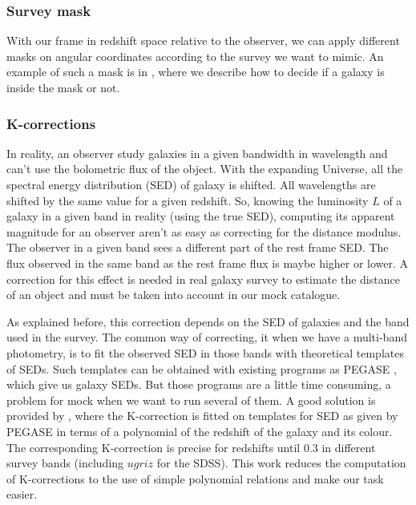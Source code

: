 \subsubsection{Survey mask}

With our frame in redshift space relative to the observer, we can apply
different masks on angular coordinates according to the survey we want to
mimic. An example of such a mask is in , where we
describe how to decide if a galaxy is inside the mask or not.

\subsubsection{K-corrections}

In reality, an observer study galaxies in a given bandwidth in wavelength and
can't use the bolometric flux of the object. With the expanding Universe, all
the spectral energy distribution (SED) of galaxy is shifted. All wavelengths
are shifted by the same value for a given redshift. So, knowing the luminosity
$L$ of a galaxy in a given band in reality (using the true SED), computing its
apparent magnitude for an observer aren't as easy as correcting for the
distance modulus. The observer in a given band sees a different part of the
rest frame SED\@. The flux observed in the same band as the rest frame flux is
maybe higher or lower. A correction for this effect is needed in real galaxy
survey to estimate the distance of an object and must be taken into account in
our mock catalogue.

As explained before, this correction depends on the SED of galaxies and the
band used in the survey. The common way of correcting, it when we have a
multi-band photometry, is to fit the observed SED in those bands with
theoretical templates of SEDs. Such templates can be obtained with existing
programs as PEGASE \citep{LeBorgne+04}, which give us galaxy SEDs. But those
programs are a little time consuming, a problem for mock when we want to run
several of them. A good solution is provided by \citet{Chilingarian+10}, where
the K-correction is fitted on templates for SED as given by PEGASE in terms of
a polynomial of the redshift of the galaxy and its colour. The corresponding
K-correction is precise for redshifts until 0.3 in different survey bands
(including $ugriz$ for the SDSS). This work reduces the computation of
K-corrections to the use of simple polynomial relations and make our task
easier.

